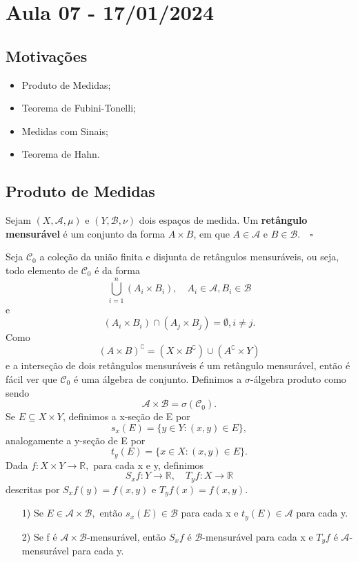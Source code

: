 \documentclass[measure_theory.tex]{subfiles}
\begin{document}
\section{Aula 07 - 17/01/2024}
\subsection{Motivações}
\begin{itemize}
	\item Produto de Medidas;
	\item Teorema de Fubini-Tonelli;
	\item Medidas com Sinais;
	\item Teorema de Hahn.
\end{itemize}
\subsection{Produto de Medidas}
\begin{def*}
	Sejam \((X, \mathcal{A}, \mu )\) e \((Y, \mathcal{B}, \nu)\) dois espaços de medida. Um \textbf{retângulo mensurável} é um
	conjunto da forma \(A\times B\), em que \(A\in \mathcal{A}\) e \(B\in \mathcal{B}.\quad \square\)
\end{def*}
Seja \(\mathcal{C}_{0}\) a coleção da união finita e disjunta de retângulos mensuráveis, ou seja, todo elemento de \(\mathcal{C}_{0}\) é da forma
\[
	\bigcup_{i=1}^{n}(A_{i}\times B_{i}),\quad A_{i}\in \mathcal{A}, B_{i}\in \mathcal{B}
\]
e
\[
	(A_{i}\times B_{i})\cap (A_{j}\times B_{j}) = \emptyset , i\neq j.
\]
Como
\[
	(A\times B)^{\complement} = (X\times B ^{\complement})\cup (A ^{\complement}\times Y)
\]
e a interseção de dois retângulos mensuráveis é um retângulo mensurável, então é fácil ver que \(\mathcal{C}_{0}\) é uma álgebra de conjunto. Definimos a \(\sigma \)-álgebra produto como sendo
\[
	\mathcal{A}\times \mathcal{B} = \sigma (\mathcal{C}_{0}).
\]
Se \(E\subseteq X\times Y\), definimos a x-seção de E por
\[
	s_x(E) = \{y\in Y: (x, y)\in E\},
\]
analogamente a y-seção de E por
\[
	t_y(E) = \{x\in X: (x, y)\in E\}.
\]
Dada \(f:X\times Y\rightarrow \mathbb{R},\) para cada x e y, definimos
\[
	S_{x}f :Y\rightarrow \mathbb{R}, \quad T_{y}f:X\rightarrow \mathbb{R}
\]
descritas por \(S_xf(y) = f(x, y)\) e \(T_yf(x) = f(x, y).\)
\begin{lemma*}
	\begin{itemize}
		\item[1)] Se \(E\in \mathcal{A}\times \mathcal{B},\) então \(s_x(E)\in \mathcal{B}\) para cada x e \(t_y(E)\in \mathcal{A}\) para cada y.
		\item[2)] Se f é \(\mathcal{A}\times \mathcal{B}\)-mensurável, então \(S_{x}f\) é \(\mathcal{B}\)-mensurável para cada x e \(T_yf\) é \(\mathcal{A}\)-mensurável para cada y.
	\end{itemize}
\end{lemma*}
\end{document}
